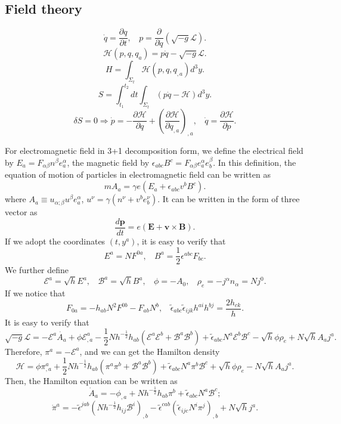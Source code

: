 \subsection{Field theory}
\[\dot{q} = \frac{\partial q}{\partial t}, \ \ \ \ p=\frac{\partial}{\partial \dot{q}}(\sqrt{-g} \mathcal{L}).\]
\[\mathcal{H}(p,q,q_a) = p\dot{q} - \sqrt{-g} \mathcal{L}.\]
\[H = \int_{\Sigma_t} \mathcal{H}(p,q,q_{,a})d^3y.\]
\[S = \int_{t_1}^{t_2} dt \int_{\Sigma_t} (p \dot{q} - \mathcal{H} ) d^3 y.\]
\[\delta S = 0 \Rightarrow \dot{p} = -\frac{\partial \mathcal{H}}{\partial q} + \left(\frac{\partial \mathcal{H}}{\partial q_{,a}}\right)_{,a}, \ \ \ \ \dot{q} = \frac{\partial \mathcal{H}}{\partial p}.\]
\begin{example}
For electromagnetic field in 3+1 decomposition form, we define the electrical field by $E_a = F_{\alpha \beta} n^{\beta} e_a^{\alpha}$, the magnetic field by $\epsilon_{abc} B^c = F_{\alpha \beta} e_a^{\alpha} e_b^{\beta}$. 
In this definition, the equation of motion of particles in electromagnetic field can be written as
\[m A_a = \gamma e (E_a + \epsilon_{abc} v^b B^c).\]
where $A_a \equiv u_{\alpha;\beta} u^{\beta} e_a^{\alpha}$, $u^{\nu} = \gamma (n^{\nu} + v^b e_{b}^{\nu})$. 
It can be written in the form of three vector as
\[\frac{d\bm {p}}{dt} = e(\bm {E} + \bm {v} \times \bm {B}).\]
If we adopt the coordinates $(t,y^a)$, it is easy to verify that
\[E^a = N F^{0a}, \ \ \ \ B^a = \frac{1}{2} \epsilon^{abc} F_{bc}.\]
We further define
\[\mathcal{E}^a = \sqrt{h} E^a, \ \ \ \ \mathcal{B}^a = \sqrt{h} B^a, \ \ \ \ \phi = - A_0, \ \ \ \ \rho_{e} = -j^{\alpha} n_{\alpha} = N j^0.\]
If we notice that
\[F_{0a} = -h_{ab}N^2F^{0b} - F_{ab}N^b, \ \ \ \ \tilde{\epsilon}_{abc} \tilde{\epsilon}_{ijk} h^{ai} h^{bj} = \frac{2h_{ck}}{h}.\]
It is easy to verify that
\[ \sqrt{-g} \mathcal{L} = - \mathcal{E}^a \dot{A_a} + \phi \mathcal{E}^a_{,a} - \frac{1}{2} N h^{-\frac{1}{2}} h_{ab} (\mathcal{E}^a \mathcal{E}^b + \mathcal{B}^a \mathcal{B}^b) + \tilde{\epsilon}_{abc}N^a \mathcal{E}^b \mathcal{B}^c -\sqrt{h} \phi \rho_e + N \sqrt{h} A_a j^a.\]
Therefore, $\pi^a = -\mathcal{E}^a$, and we can get the Hamilton density
\[\mathcal{H} = \phi \pi^a_{,a} + \frac{1}{2} N h^{-\frac{1}{2}} h_{ab} (\pi^a \pi^b + \mathcal{B}^a \mathcal{B}^b) + \tilde{\epsilon}_{abc}N^a \pi^b \mathcal{B}^c +\sqrt{h} \phi \rho_e - N \sqrt{h} A_a j^a.\]
Then, the Hamilton equation can be written as
\[\dot{A}_a = -\phi_{,a} + N h^{-\frac{1}{2}} h_{ab}\pi^b + \tilde{\epsilon}_{abc}N^a \mathcal{B}^c;\]
\[\dot{\pi}^a = - \tilde{\epsilon}^{jab}(Nh^{-\frac{1}{2}}h_{ij}\mathcal{B}^i)_{,b} - \tilde{\epsilon}^{cab}(\tilde{\epsilon}_{ijc}N^i \pi^j)_{,b} + N\sqrt{h}j^a .\]

\end{example}
